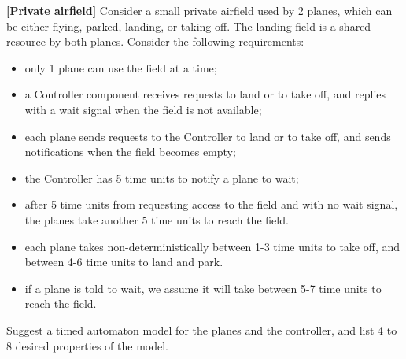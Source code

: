 \documentclass[11pt]{article}
\begin{document}

\begin{exercise} \label{ex:airfield}
\textbf{[Private airfield]}
Consider a small private airfield used by 2 planes, which can be either flying, parked, landing, or taking off. The landing field is a shared resource by both planes. Consider the following requirements:
\begin{itemize}
  \setlength\itemsep{0.3mm}
  \item only 1 plane can use the field at a time;
  \item a Controller component receives requests to land or to take off, and replies with a wait signal when the field is not available;
  \item each plane sends requests to the Controller to land or to take off, and sends notifications when the field becomes empty;
  \item the Controller has 5 time units to notify a plane to wait;
  \item after 5 time units from requesting access to the field and with no wait signal, the planes take another 5 time units to reach the field.
  \item each plane takes non-deterministically between 1-3 time units to take off, and between 4-6 time units to land and park.
  \item if a plane is told to wait, we assume it will take between 5-7 time units to reach the field.
\end{itemize}

Suggest a timed automaton model for the planes and the controller, and list 4 to 8 desired properties of the model.
\end{exercise}
\end{document}
